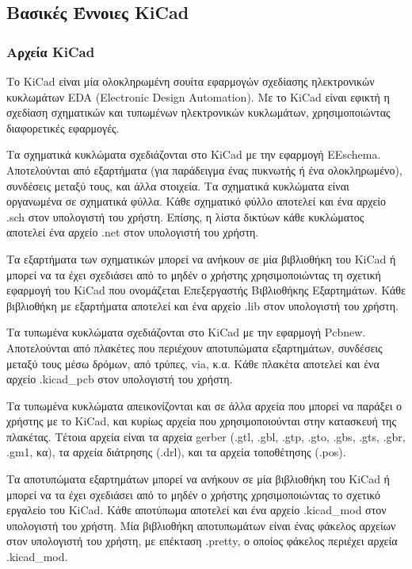 \documentclass[a4paper]{article}
\begin{document}
\subsection{Βασικές Έννοιες KiCad}

\subsubsection{Αρχεία KiCad}
Το \textenglish{KiCad} είναι μία ολοκληρωμένη σουίτα εφαρμογών σχεδίασης ηλεκτρονικών κυκλωμάτων \textenglish{EDA (Electronic Design Automation)}. Με το \textenglish{KiCad} είναι εφικτή η σχεδίαση σχηματικών και τυπωμένων ηλεκτρονικών κυκλωμάτων, χρησιμοποιώντας διαφορετικές εφαρμογές.

Τα σχηματικά κυκλώματα σχεδιάζονται στο \textenglish{KiCad} με την εφαρμογή \textenglish{EEschema}. Αποτελούνται από εξαρτήματα (για παράδειγμα ένας πυκνωτής ή ένα ολοκληρωμένο), συνδέσεις μεταξύ τους, και άλλα στοιχεία. Τα σχηματικά κυκλώματα είναι οργανωμένα σε σχηματικά φύλλα. Κάθε σχηματικό φύλλο αποτελεί και ένα αρχείο .sch στον υπολογιστή του χρήστη. Επίσης, η λίστα δικτύων κάθε κυκλώματος αποτελεί ένα αρχείο .net στον υπολογιστή του χρήστη.

Τα εξαρτήματα των σχηματικών μπορεί να ανήκουν σε μία βιβλιοθήκη του \textenglish{KiCad} ή μπορεί να τα έχει σχεδιάσει από το μηδέν ο χρήστης χρησιμοποιώντας τη σχετική εφαρμογή του \textenglish{KiCad} που ονομάζεται Επεξεργαστής Βιβλιοθήκης Εξαρτημάτων. Κάθε βιβλιοθήκη με εξαρτήματα αποτελεί και ένα αρχείο .lib στον υπολογιστή του χρήστη.

Τα τυπωμένα κυκλώματα σχεδιάζονται στο \textenglish{KiCad} με την εφαρμογή Pcbnew. Αποτελούνται από πλακέτες που περιέχουν αποτυπώματα εξαρτημάτων, συνδέσεις μεταξύ τους μέσω δρόμων, από τρύπες, via, κ.α.
Κάθε πλακέτα αποτελεί και ένα αρχείο .kicad\_pcb στον υπολογιστή του χρήστη. 

Τα τυπωμένα κυκλώματα απεικονίζονται και σε άλλα αρχεία που μπορεί να παράξει ο χρήστης με το \textenglish{KiCad}, και κυρίως αρχεία που χρησιμοποιούνται στην κατασκευή της πλακέτας. Τέτοια αρχεία είναι τα αρχεία gerber (.gtl, .gbl, .gtp, .gto, .gbs, .gts, .gbr, .gm1, κα), τα αρχεία διάτρησης (.drl), και τα αρχεία τοποθέτησης (.pos).

Τα αποτυπώματα εξαρτημάτων μπορεί να ανήκουν σε μία βιβλιοθήκη του \textenglish{KiCad} ή μπορεί να τα έχει σχεδιάσει από το μηδέν ο χρήστης χρησιμοποιώντας το σχετικό εργαλείο του \textenglish{KiCad}. Κάθε αποτύπωμα αποτελεί και ένα αρχείο .kicad\_mod στον υπολογιστή του χρήστη. Μία βιβλιοθήκη αποτυπωμάτων είναι ένας φάκελος αρχείων στον υπολογιστή του χρήστη, με επέκταση .pretty, ο οποίος φάκελος περιέχει αρχεία .kicad\_mod.
\end{document}
